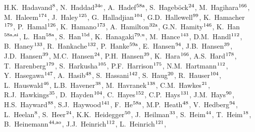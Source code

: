 \begin{flushleft}
H.K.~Hadavand$^\textrm{\scriptsize 8}$,    
N.~Haddad$^\textrm{\scriptsize 34e}$,    
A.~Hadef$^\textrm{\scriptsize 58a}$,    
S.~Hageb\"ock$^\textrm{\scriptsize 24}$,    
M.~Hagihara$^\textrm{\scriptsize 166}$,    
M.~Haleem$^\textrm{\scriptsize 174}$,    
J.~Haley$^\textrm{\scriptsize 125}$,    
G.~Halladjian$^\textrm{\scriptsize 104}$,    
G.D.~Hallewell$^\textrm{\scriptsize 99}$,    
K.~Hamacher$^\textrm{\scriptsize 179}$,    
P.~Hamal$^\textrm{\scriptsize 126}$,    
K.~Hamano$^\textrm{\scriptsize 173}$,    
A.~Hamilton$^\textrm{\scriptsize 32a}$,    
G.N.~Hamity$^\textrm{\scriptsize 146}$,    
K.~Han$^\textrm{\scriptsize 58a,ai}$,    
L.~Han$^\textrm{\scriptsize 58a}$,    
S.~Han$^\textrm{\scriptsize 15d}$,    
K.~Hanagaki$^\textrm{\scriptsize 79,u}$,    
M.~Hance$^\textrm{\scriptsize 143}$,    
D.M.~Handl$^\textrm{\scriptsize 112}$,    
B.~Haney$^\textrm{\scriptsize 133}$,    
R.~Hankache$^\textrm{\scriptsize 132}$,    
P.~Hanke$^\textrm{\scriptsize 59a}$,    
E.~Hansen$^\textrm{\scriptsize 94}$,    
J.B.~Hansen$^\textrm{\scriptsize 39}$,    
J.D.~Hansen$^\textrm{\scriptsize 39}$,    
M.C.~Hansen$^\textrm{\scriptsize 24}$,    
P.H.~Hansen$^\textrm{\scriptsize 39}$,    
K.~Hara$^\textrm{\scriptsize 166}$,    
A.S.~Hard$^\textrm{\scriptsize 178}$,    
T.~Harenberg$^\textrm{\scriptsize 179}$,    
S.~Harkusha$^\textrm{\scriptsize 105}$,    
P.F.~Harrison$^\textrm{\scriptsize 175}$,    
N.M.~Hartmann$^\textrm{\scriptsize 112}$,    
Y.~Hasegawa$^\textrm{\scriptsize 147}$,    
A.~Hasib$^\textrm{\scriptsize 48}$,    
S.~Hassani$^\textrm{\scriptsize 142}$,    
S.~Haug$^\textrm{\scriptsize 20}$,    
R.~Hauser$^\textrm{\scriptsize 104}$,    
L.~Hauswald$^\textrm{\scriptsize 46}$,    
L.B.~Havener$^\textrm{\scriptsize 38}$,    
M.~Havranek$^\textrm{\scriptsize 138}$,    
C.M.~Hawkes$^\textrm{\scriptsize 21}$,    
R.J.~Hawkings$^\textrm{\scriptsize 35}$,    
D.~Hayden$^\textrm{\scriptsize 104}$,    
C.~Hayes$^\textrm{\scriptsize 152}$,    
C.P.~Hays$^\textrm{\scriptsize 131}$,    
J.M.~Hays$^\textrm{\scriptsize 90}$,    
H.S.~Hayward$^\textrm{\scriptsize 88}$,    
S.J.~Haywood$^\textrm{\scriptsize 141}$,    
F.~He$^\textrm{\scriptsize 58a}$,    
M.P.~Heath$^\textrm{\scriptsize 48}$,    
V.~Hedberg$^\textrm{\scriptsize 94}$,    
L.~Heelan$^\textrm{\scriptsize 8}$,    
S.~Heer$^\textrm{\scriptsize 24}$,    
K.K.~Heidegger$^\textrm{\scriptsize 50}$,    
J.~Heilman$^\textrm{\scriptsize 33}$,    
S.~Heim$^\textrm{\scriptsize 44}$,    
T.~Heim$^\textrm{\scriptsize 18}$,    
B.~Heinemann$^\textrm{\scriptsize 44,ao}$,    
J.J.~Heinrich$^\textrm{\scriptsize 112}$,    
L.~Heinrich$^\textrm{\scriptsize 121}$,    

\end{flushleft}
